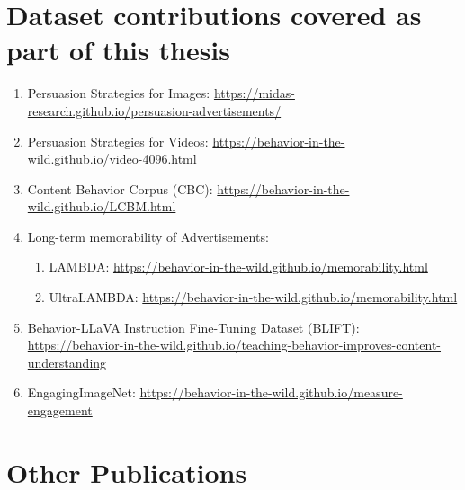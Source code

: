 \chapter*{Dataset contributions covered as part of this thesis}

\begin{enumerate}
    \item Persuasion Strategies for Images: \url{https://midas-research.github.io/persuasion-advertisements/}
    \item Persuasion Strategies for Videos: \url{https://behavior-in-the-wild.github.io/video-4096.html}
    \item Content Behavior Corpus (CBC): \url{https://behavior-in-the-wild.github.io/LCBM.html}
    \item Long-term memorability of Advertisements:
    \begin{enumerate}
        \item LAMBDA: \url{https://behavior-in-the-wild.github.io/memorability.html}
        \item UltraLAMBDA: \url{https://behavior-in-the-wild.github.io/memorability.html}
    \end{enumerate}
    \item Behavior-LLaVA Instruction Fine-Tuning Dataset (BLIFT): \url{https://behavior-in-the-wild.github.io/teaching-behavior-improves-content-understanding}
    \item EngagingImageNet: \url{https://behavior-in-the-wild.github.io/measure-engagement}
\end{enumerate}




\chapter*{Other Publications}

